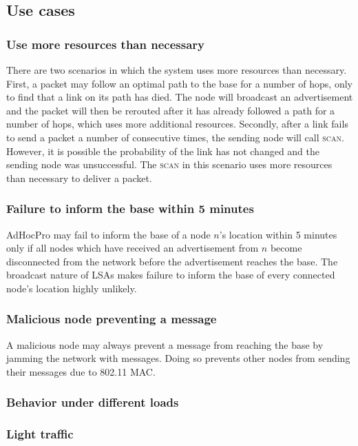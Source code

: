 \documentclass[letterpaper]{article}
\begin{document}
\subsection{Use cases}

\subsubsection{Use more resources than necessary}

There are two scenarios in which the system uses more resources than necessary. First, a packet may follow an optimal path
to the base for a number of hops, only to find that a link on its path has died. The node will broadcast an advertisement
and the packet will then be rerouted after it has already followed a path for a number of hops, which uses more additional
resources. Secondly, after a link fails to send a packet a number of consecutive times, the sending node will call
\textsc{scan}. However, it is possible the probability of the link has not changed and the sending node was unsuccessful.
The \textsc{scan} in this scenario uses more resources than necessary to deliver a packet.

\subsubsection{Failure to inform the base within 5 minutes}

AdHocPro may fail to inform the base of a node $n$'s location within 5 minutes only if all nodes which have received an
advertisement from $n$ become disconnected from the network before the advertisement reaches the base. The broadcast
nature of LSAs makes failure to inform the base of every connected node's location highly unlikely.

\subsubsection{Malicious node preventing a message}

A malicious node may always prevent a message from reaching the base by jamming the network with messages. Doing so prevents
other nodes from sending their messages due to 802.11 MAC.

\subsubsection{Behavior under different loads}

\subsubsection{Light traffic}
\end{document}

